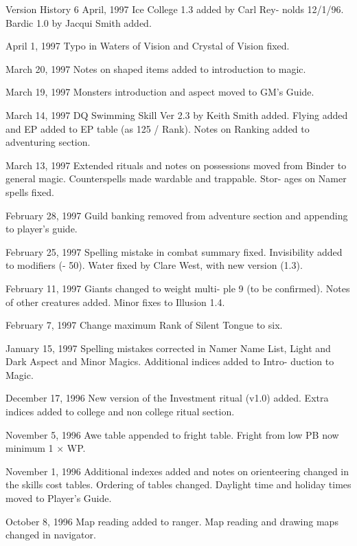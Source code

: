 \begin{Chapter}{Version History}
6  April,  1997  Ice  College  1.3  added  by  Carl  Rey-
nolds 12/1/96. Bardic 1.0 by Jacqui Smith added. 

April 1, 1997 Typo in Waters of Vision and Crystal 
of Vision fixed. 

March  20,  1997  Notes  on  shaped  items  added  to 
introduction to magic. 

March  19,  1997  Monsters  introduction  and  aspect 
moved to GM’s Guide. 

March  14,  1997  DQ  Swimming  Skill  Ver  2.3  by 
Keith Smith added. Flying added and EP added to 
EP table (as 125 / Rank). Notes on Ranking added 
to adventuring section. 

March  13,  1997  Extended  rituals  and  notes  on 
possessions  moved  from  Binder  to  general  magic. 
Counterspells  made  wardable  and  trappable.  Stor-
ages on Namer spells fixed. 

February  28,  1997  Guild  banking  removed  from 
adventure section and appending to player’s guide. 

February  25,  1997  Spelling  mistake  in  combat 
summary  fixed.  Invisibility  added  to  modifiers  (-
50). Water  fixed  by  Clare West,  with new  version 
(1.3). 

February 11, 1997 Giants changed to weight multi-
ple  9  (to  be  confirmed).  Notes  of  other  creatures 
added. Minor fixes to Illusion 1.4. 

February 7, 1997 Change maximum Rank of Silent 
Tongue to six. 

January  15,  1997  Spelling  mistakes  corrected  in 
Namer  Name  List,  Light  and  Dark  Aspect  and 
Minor  Magics.  Additional  indices  added  to  Intro-
duction to Magic. 

December 17, 1996 New version of the Investment 
ritual  (v1.0)  added.  Extra  indices  added  to  college 
and non college ritual section. 

November  5,  1996  Awe  table  appended  to  fright 
table. Fright from low PB now minimum 1 × WP. 

November  1,  1996  Additional  indexes  added  and 
notes  on  orienteering  changed  in  the  skills  cost 
tables.  Ordering  of  tables  changed.  Daylight  time 
and holiday times moved to Player’s Guide. 

October 8, 1996 Map reading added to ranger. Map 
reading  and  drawing  maps  changed  in  navigator. 
\end{Chapter}
